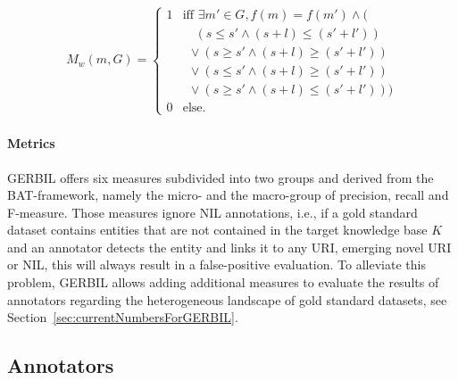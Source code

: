 \begin{align}
M_w (m,G)=
\begin{cases}
1 &  \text{iff }\exists m' \in G, f(m) = f(m')  \land (\\
 &\ \ \ \,\, ( s \leq s' \land (s+l) \leq (s'+l') )\\ %
 &\ \ \lor ( s \geq s' \land (s+l) \geq (s'+l') )\\ %
 &\ \ \lor ( s \leq s' \land (s+l) \geq (s'+l') )\\ %
 &\ \ \lor ( s \geq s' \land (s+l) \leq (s'+l') ))\\ %
0 & \text{else.}
\end{cases}
\end{align}


\paragraph{Metrics}
GERBIL offers six measures subdivided into two groups and derived from the BAT-framework, namely the micro- and the macro-group of precision, recall and F-measure.
Those measures ignore NIL annotations, i.e., if a gold standard dataset contains entities that are not contained in the target knowledge base $K$ and an annotator detects the entity and links it to any URI, emerging novel URI or NIL, this will always result in a false-positive evaluation. 
To alleviate this problem, GERBIL allows adding additional measures to evaluate the results of annotators regarding the heterogeneous landscape of gold standard datasets, see Section~\ref{sec:currentNumbersForGERBIL}.

\subsection{Annotators}
\label{sec:annotators}

